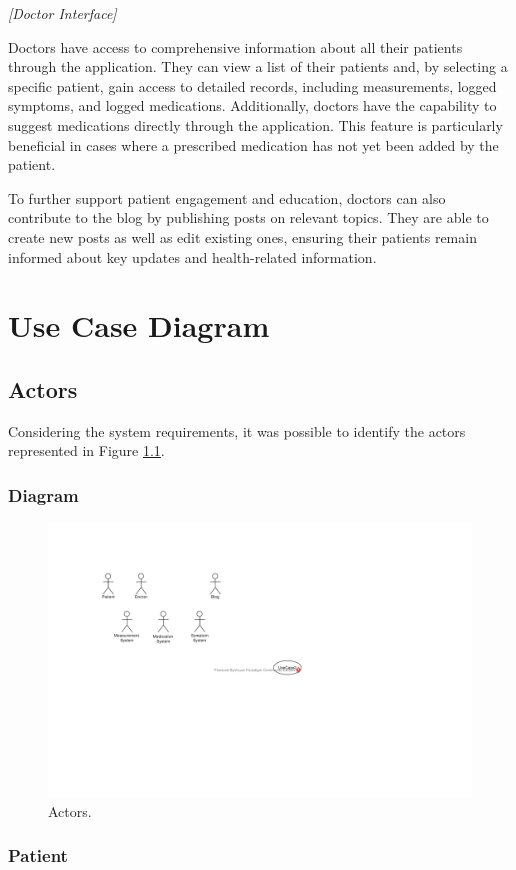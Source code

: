\documentclass{report}
\begin{document}
\textit{[Doctor Interface]}


Doctors have access to comprehensive information about all their patients through the application. 
They can view a list of their patients and, by selecting a specific patient, gain access to detailed records, including measurements, logged symptoms, and logged medications. 
Additionally, doctors have the capability to suggest medications directly through the application. 
This feature is particularly beneficial in cases where a prescribed medication has not yet been added by the patient.

To further support patient engagement and education, doctors can also contribute to the blog by publishing posts on relevant topics. 
They are able to create new posts as well as edit existing ones, ensuring their patients remain informed about key updates and health-related information.



\newpage
\chapter{Use Case Diagram}

\section{Actors}
Considering the system requirements, it was possible to identify the actors represented in Figure \ref{fig:Actors}.

\subsection{Diagram}
\begin{figure}[ht]
    \centering
    \includegraphics[width=0.5\linewidth]{Actors.pdf}
    \caption{Actors.}
    \label{fig:Actors}
\end{figure}

\subsection{Patient}
\end{document}
